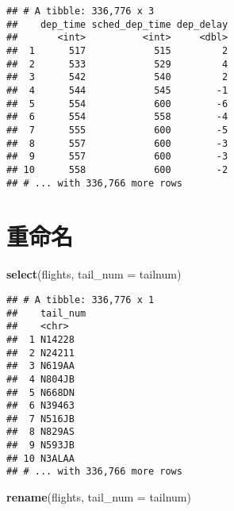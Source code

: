 \documentclass[
]{article}
\newenvironment{Shaded}{\begin{snugshade}}{\end{snugshade}}
\newcommand{\DataTypeTok}[1]{\textcolor[rgb]{0.13,0.29,0.53}{#1}}
\newcommand{\KeywordTok}[1]{\textcolor[rgb]{0.13,0.29,0.53}{\textbf{#1}}}
\newcommand{\NormalTok}[1]{#1}
\begin{document}
\begin{verbatim}
## # A tibble: 336,776 x 3
##    dep_time sched_dep_time dep_delay
##       <int>          <int>     <dbl>
##  1      517            515         2
##  2      533            529         4
##  3      542            540         2
##  4      544            545        -1
##  5      554            600        -6
##  6      554            558        -4
##  7      555            600        -5
##  8      557            600        -3
##  9      557            600        -3
## 10      558            600        -2
## # ... with 336,766 more rows
\end{verbatim}

\hypertarget{ux91cdux547dux540d}{%
\section{重命名}\label{ux91cdux547dux540d}}

\begin{Shaded}
\begin{Highlighting}[]
\KeywordTok{select}\NormalTok{(flights, }\DataTypeTok{tail_num =}\NormalTok{ tailnum)}
\end{Highlighting}
\end{Shaded}

\begin{verbatim}
## # A tibble: 336,776 x 1
##    tail_num
##    <chr>   
##  1 N14228  
##  2 N24211  
##  3 N619AA  
##  4 N804JB  
##  5 N668DN  
##  6 N39463  
##  7 N516JB  
##  8 N829AS  
##  9 N593JB  
## 10 N3ALAA  
## # ... with 336,766 more rows
\end{verbatim}

\begin{Shaded}
\begin{Highlighting}[]
\KeywordTok{rename}\NormalTok{(flights, }\DataTypeTok{tail_num =}\NormalTok{ tailnum)}
\end{Highlighting}
\end{Shaded}
\end{document}
